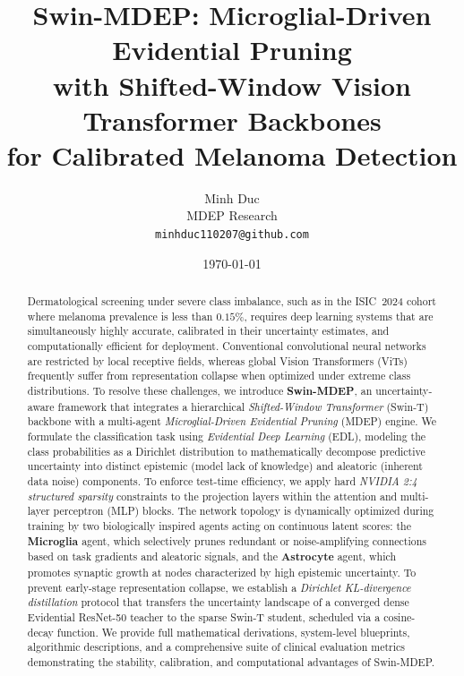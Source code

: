 \documentclass[11pt]{article}
\title{%
  \textbf{Swin-MDEP: Microglial-Driven Evidential Pruning\\
  with Shifted-Window Vision Transformer Backbones\\
  for Calibrated Melanoma Detection}%
}
\author{
  Minh Duc \\
  MDEP Research \\
  \texttt{minhduc110207@github.com}
}
\date{\today}
\begin{document}
\maketitle

\begin{abstract}
Dermatological screening under severe class imbalance, such as in the ISIC~2024 cohort where melanoma prevalence is less than $0.15\%$, requires deep learning systems that are simultaneously highly accurate, calibrated in their uncertainty estimates, and computationally efficient for deployment. Conventional convolutional neural networks are restricted by local receptive fields, whereas global Vision Transformers (ViTs) frequently suffer from representation collapse when optimized under extreme class distributions. To resolve these challenges, we introduce \textbf{Swin-MDEP}, an uncertainty-aware framework that integrates a hierarchical \emph{Shifted-Window Transformer} (Swin-T) backbone with a multi-agent \emph{Microglial-Driven Evidential Pruning} (MDEP) engine. We formulate the classification task using \emph{Evidential Deep Learning} (EDL), modeling the class probabilities as a Dirichlet distribution to mathematically decompose predictive uncertainty into distinct epistemic (model lack of knowledge) and aleatoric (inherent data noise) components. To enforce test-time efficiency, we apply hard \emph{NVIDIA 2:4 structured sparsity} constraints to the projection layers within the attention and multi-layer perceptron (MLP) blocks. The network topology is dynamically optimized during training by two biologically inspired agents acting on continuous latent scores: the \textbf{Microglia} agent, which selectively prunes redundant or noise-amplifying connections based on task gradients and aleatoric signals, and the \textbf{Astrocyte} agent, which promotes synaptic growth at nodes characterized by high epistemic uncertainty. To prevent early-stage representation collapse, we establish a \emph{Dirichlet KL-divergence distillation} protocol that transfers the uncertainty landscape of a converged dense Evidential ResNet-50 teacher to the sparse Swin-T student, scheduled via a cosine-decay function. We provide full mathematical derivations, system-level blueprints, algorithmic descriptions, and a comprehensive suite of clinical evaluation metrics demonstrating the stability, calibration, and computational advantages of Swin-MDEP.
\end{abstract}
\end{document}
